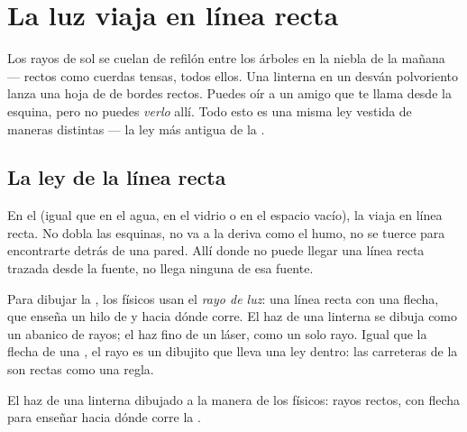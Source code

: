 \chapter{La luz viaja en línea recta}\label{ch:g4:light-straight-lines}

Los rayos de sol se cuelan de refilón entre los árboles en la niebla
de la mañana --- rectos como cuerdas tensas, todos ellos. Una linterna
en un desván polvoriento lanza una hoja de  de bordes rectos.
Puedes oír a un amigo que te llama desde la esquina, pero no puedes
\emph{verlo} allí. Todo esto es una misma ley vestida de maneras
distintas --- la ley más antigua de la .

\section{La ley de la línea recta}

\begin{proposition}\label{prop:g4:light-straight-lines:law}
En el  (igual que en el agua, en el vidrio o en el espacio
vacío), la  viaja en línea recta. No dobla las esquinas, no va a
la deriva como el humo, no se tuerce para encontrarte detrás de una
pared. Allí donde no puede llegar una línea recta trazada desde la
fuente, no llega ninguna  de esa fuente.
\end{proposition}

\begin{definition}\label{def:g4:light-straight-lines:ray}
Para dibujar la , los físicos usan el \emph{rayo de
luz}: una línea recta con una flecha, que enseña un
hilo de  y hacia dónde corre. El haz de una linterna se dibuja
como un abanico de rayos; el haz fino de un láser, como un solo rayo.
Igual que la flecha de una , el rayo es un dibujito que lleva
una ley dentro: las carreteras de la  son rectas como una regla.
\end{definition}

\begin{omfigure}

{\small El haz de una linterna dibujado a la manera de los físicos:
rayos rectos, con flecha para enseñar hacia dónde corre la .}
\end{omfigure}

